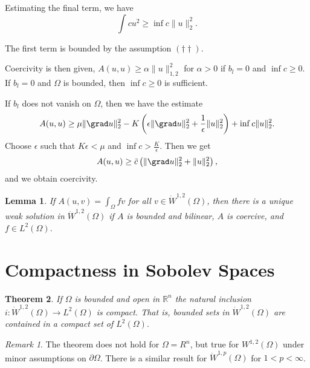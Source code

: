 \documentclass[10pt, oneside, reqno]{amsart}
\theoremstyle{plain}%
\newtheorem{thm}{Theorem}[section]
\newtheorem{lem}[thm]{Lemma}
\numberwithin{equation}{section}
\theoremstyle{definition}
\theoremstyle{remark}
\newtheorem*{rem}{Remark}
\newcommand{\R}{\mathbb{R}}
\begin{document}
Estimating the final term, we have \[
    \int c u^2 \geq \inf c \| u \|_2^2.
\]  

The first term is bounded by the assumption $(\dagger \dagger)$.

Coercivity is then given, $A(u, u) \geq \alpha \| u \|_{1, 2}^2$ for $\alpha > 0$ if $b_l = 0$ and $\inf c \geq 0$.  If $b_l = 0$ and $\Omega$ is bounded, then $\inf c \geq 0$ is sufficient. 

If $b_l$ does not vanish on $\Omega$, then we have the estimate \[
    A(u, u) \geq \mu \| \grad u \|_2^2 - K \left( \epsilon \| \grad u \|_2^2 + \frac{1}{\epsilon} \| u \|_2^2 \right) + \inf c \| u \|_2^2.
\]  Choose $\epsilon$ such that $K \epsilon < \mu$ and $\inf c > \frac{K}{\epsilon}$.  Then we get \[
    A(u, u) \geq \tilde c \left( \| \grad u \|_2^2 + \| u \|_2^2 \right),
\] and we obtain coercivity.

\begin{lem}
    If $A(u, v) = \int_\Omega f v$ for all $v \in \dot W^{1, 2}(\Omega)$, then there is a unique weak solution in $\dot W^{1, 2}(\Omega)$ if $A$ is bounded and bilinear, $A$ is coercive, and $f \in L^2(\Omega)$. 
\end{lem}


\section{Compactness in Sobolev Spaces} %
\label{sec:compactness_in_sobolev_spaces}

\begin{thm}
    \label{thm:compactness_of_w12_inclusion}
    If $\Omega$ is bounded and open in $\R^n$ the natural inclusion $i: \dot W^{1, 2}(\Omega) \rightarrow L^2(\Omega)$ is compact.  That is, bounded sets in $\dot W^{1, 2}(\Omega)$ are contained in a compact set of $L^2(\Omega)$.  
\end{thm}

\begin{rem}
    The theorem does not hold for $\Omega = R^n$, but true for $W^{1, 2}(\Omega)$ under minor assumptions on $\partial \Omega$.  There is a similar result for $\dot W^{1, p}(\Omega)$ for $1 < p < \infty$.
\end{rem}
\end{document}
